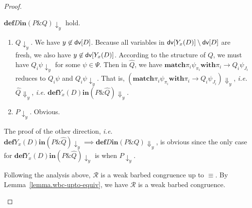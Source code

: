 \documentclass{LMCS}
\makeatletter
\newcommand{\pt}{\pi}
\newcommand{\ie}{\emph{i.e.}\@\xspace}
\newcommand{\kwd}[1]{\ensuremath{\mathbf{#1}}}
\newcommand{\prefix}[1]{\mathopen{}\mathrel{\kwd {#1}}}
\newcommand{\infix}[1]{\mathrel{\kwd {#1}}}
\renewcommand{\_}{\mathord{\rule[-.25ex]{1ex}{.15ex}}}
\newcommand{\para}[2]{#1\mathop{\&}#2}
\newcommand{\define}[2]{\prefix{def} #1 \infix{in} #2}
\newcommand{\matchone}[3]{\prefix{match} #1 \infix{with} #2
  \rightarrow #3}
\newcommand{\R}{\mathrel{\mathcal{R}}}
\newcommand{\weakbarb}[2]{#1\!\Downarrow_{#2}}
\newcommand{\barb}[2]{#1\!\downarrow_{#2}}
\newcommand{\dv}[1]{\mbox{\sf dv}[#1]}
\newcommand{\bisi}[1]{\widehat{#1}}
\makeatother
\begin{document}
\begin{proof}
\begin{enumerate}[$\bullet$]
      $\barb{\define{D}{(\para{P}{Q})}}{y}$ hold.
    \begin{enumerate}[(1)]
    \item $\barb{Q}{y}$. We have $y\not\in\dv{D}$. Because all
      variables in $\dv{Y_x(D)}\setminus\dv{D}$ are fresh, we also
      have $y\not\in\dv{Y_x(D)}$. According to the structure of $Q$,
      we must have $\barb{Q_i\psi}{y}$ for some $\psi\in\Psi$.
      Then in $\bisi{Q}$, we have $
      \matchone{{\pt_i}{\psi_{\pt_i}}}{\pt_i}{{Q_i}{\psi_{J_i}}}$
      reduces to $Q_i\psi$ and $\barb{Q_i\psi}{y}$. That is,
      $\weakbarb{(\matchone{{\pt_i}{\psi_{\pt_i}}}{\pt_i}{{Q_i}{\psi_{J_i}}})}{y}$,
      \ie $\weakbarb{\bisi{Q}}{y}$, \ie
      $\weakbarb{\define{Y_x(D)}{(\para{P}{\bisi{Q}})}}{y}$.
    \item $\barb{P}{y}$. Obvious.
    \end{enumerate}
    The proof of the other direction, \ie
    $\barb{\define{Y_x(D)}{(\para{P}{\bisi{Q}})}}{y} \implies
    \weakbarb{\define{D}{(\para{P}{Q})}}{y}$, is obvious since the
    only case for
    $\barb{\define{Y_x(D)}{(\para{P}{\bisi{Q}})}}{y}$ is when
    $\barb{P}{y}$.

    Following the analysis above, $\R$ is a weak barbed congruence up
    to $\equiv$. By Lemma~\ref{lemma.wbc-upto-equiv}, we have $\R$ is a
    weak barbed congruence.


\end{enumerate}
\end{proof}
\end{document}
